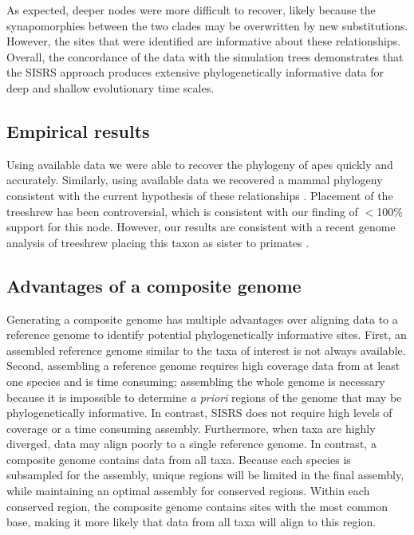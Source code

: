 \documentclass[11pt, oneside]{article}   	%
\begin{document}
As expected, deeper nodes were more difficult to recover, likely because the synapomorphies between the two clades may be overwritten by new substitutions.
However, the sites that were identified are informative about these relationships.
Overall, the concordance of the data with the simulation trees demonstrates that the SISRS approach produces extensive phylogenetically informative data for deep and shallow evolutionary time scales. 

\subsection{Empirical results}

Using available data we were able to recover the phylogeny of apes quickly and accurately. 
Similarly, using available data we recovered a mammal phylogeny consistent with the current hypothesis of these relationships \citep{Morgan2013}.
Placement of the treeshrew has been controversial, which is consistent with our finding of $<$100\% support for this node. However, our results are consistent with a recent genome analysis of treeshrew placing this taxon as sister to primates \citep{Fan2013}.

\subsection{Advantages of a composite genome}

Generating a composite genome has multiple advantages over aligning data to a reference genome to identify potential phylogenetically informative sites. 
First, an assembled reference genome similar to the taxa of interest is not always available. 
Second, assembling a reference genome requires high coverage data from at least one species and is time consuming; assembling the whole genome is necessary because it is impossible to determine \textit{a priori} regions of the genome that may be phylogenetically informative.
In contrast, SISRS does not require high levels of coverage or a time consuming assembly.
Furthermore, when taxa are highly diverged, data may align poorly to a single reference genome. 
In contrast, a composite genome contains data from all taxa. 
Because each species is subsampled for the assembly, unique regions will be limited in the final assembly, while maintaining an optimal assembly for conserved regions. 
Within each conserved region, the composite genome contains sites with the most common base, making it more likely that data from all taxa will align to this region.
\end{document}
